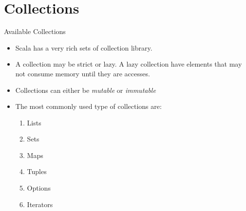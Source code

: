 \documentclass[presentation, aspectratio=169]{beamer}
\begin{document}
\section{Collections}
\label{sec:org4e0621c}

\begin{frame}[label={sec:org7d3a68a}]{Available Collections}
\begin{itemize}
\item Scala has a very rich sets of collection library.
\item A collection may be \alert{strict} or \alert{lazy}. A lazy collection have elements that may
not consume memory until they are accesses.
\item Collections can either be \emph{mutable} or \emph{immutable}
\item The most commonly used type of collections are:
\begin{enumerate}
\item Lists
\item Sets
\item Maps
\item Tuples
\item Options
\item Iterators
\end{enumerate}
\end{itemize}
\end{frame}
\end{document}
